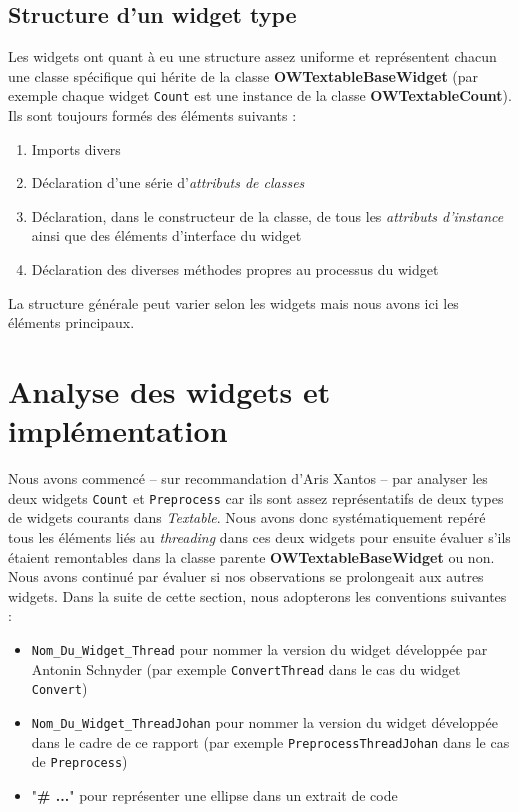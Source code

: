 \documentclass{article}
\begin{document}
\subsection{Structure d'un widget type}

Les widgets ont quant à eu une structure assez uniforme et représentent chacun une classe spécifique qui hérite de la classe \textbf{OWTextableBaseWidget} (par exemple chaque widget \texttt{Count} est une instance de la classe \textbf{OWTextableCount}). Ils sont toujours formés des éléments suivants : 

\begin{enumerate}
    \item Imports divers
    \item Déclaration d'une série d'\textit{attributs de classes}
    \item Déclaration, dans le constructeur de la classe, de tous les \textit{attributs d'instance} ainsi que des éléments d'interface du widget
    \item Déclaration des diverses méthodes propres au processus du widget
\end{enumerate}

La structure générale peut varier selon les widgets mais nous avons ici les éléments principaux.

\section{Analyse des widgets et implémentation}

Nous avons commencé – sur recommandation d'Aris Xantos – par analyser les deux widgets \texttt{Count} et \texttt{Preprocess} car ils sont assez représentatifs de deux types de widgets courants dans \textit{Textable}. Nous avons donc systématiquement repéré tous les éléments liés au \textit{threading} dans ces deux widgets pour ensuite évaluer s'ils étaient remontables dans la classe parente \textbf{OWTextableBaseWidget} ou non. Nous avons continué par évaluer si nos observations se prolongeait aux autres widgets. Dans la suite de cette section, nous adopterons les conventions suivantes : 

\begin{itemize}
    \item \texttt{Nom\_Du\_Widget\_Thread} pour nommer la version du widget développée par Antonin Schnyder (par exemple \texttt{ConvertThread} dans le cas du widget \texttt{Convert})
    \item \texttt{Nom\_Du\_Widget\_ThreadJohan} pour nommer la version du widget  développée dans le cadre de ce rapport (par exemple \texttt{PreprocessThreadJohan} dans le cas de \texttt{Preprocess})
    \item "\textbf{\# ...}" pour représenter une ellipse dans un extrait de code
\end{itemize}
\end{document}
